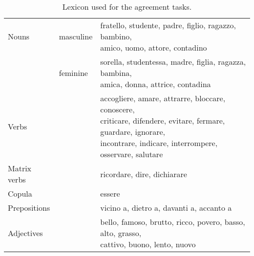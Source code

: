 \begin{table}[b]
    \label{tbl:lexicon}
    \centering
    \begin{tabular}{|lll|}
        \hline
    Nouns & masculine & \specialcell{fratello, studente, padre, figlio, ragazzo, bambino,\\ amico, uomo, attore, contadino} \\
    & feminine & \specialcell{sorella, studentessa, madre, figlia, ragazza, bambina,\\ amica, donna, attrice, contadina}\\
    \hline 
    Verbs & & \specialcell{accogliere, amare, attrarre, bloccare, conoscere,\\ criticare, difendere, evitare, fermare, guardare, ignorare,\\ incontrare, indicare, interrompere, osservare, salutare}\\
    Matrix verbs & & ricordare, dire, dichiarare \\
    Copula & & essere\\
    \hline
    Prepositions & & vicino a, dietro a, davanti a, accanto a\\
    \hline
    Adjectives & & \specialcell{bello, famoso, brutto, ricco, povero, basso, alto, grasso,\\ cattivo, buono, lento, nuovo}\\
    \hline
    \end{tabular}
    \caption{Lexicon used for the agreement tasks.}
\end{table}
